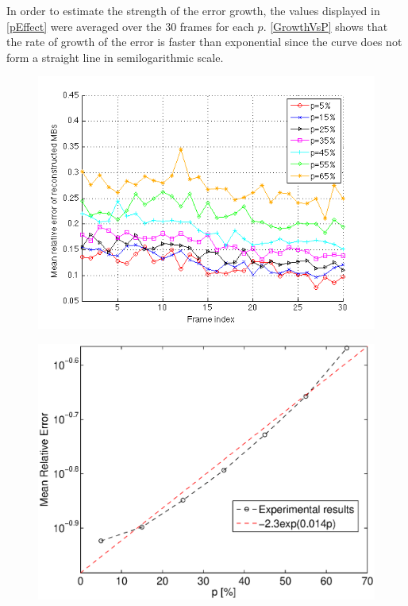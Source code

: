 \documentclass[a4paper, 11pt]{article} %
\begin{document}
In order to estimate the strength of the error growth, the values displayed in \autoref{pEffect} were averaged over the 30 frames for each $p$. \autoref{GrowthVsP} shows that the rate of growth of the error is faster than exponential since the curve does not form a straight line in semilogarithmic scale.
\begin{figure}[h!]
\centering
\includegraphics[scale=0.55]{pEffect}
\caption{\label{pEffect}}
\end{figure}

\begin{figure}[h!]
\centering
\includegraphics[scale=0.45]{GrowthVsP.eps}
\caption{\label{GrowthVsP}}
\end{figure}
\end{document}
